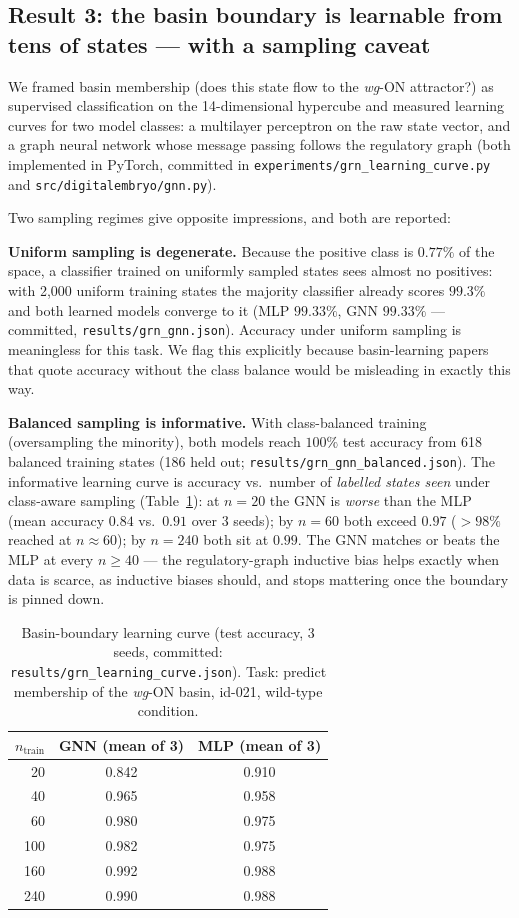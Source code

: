 \subsection{Result 3: the basin boundary is learnable from tens of states ---
with a sampling caveat}
\label{sec:basinlearn}

We framed basin membership (does this state flow to the \emph{wg}-ON
attractor?) as supervised classification on the 14-dimensional hypercube and
measured learning curves for two model classes: a multilayer perceptron on
the raw state vector, and a graph neural network whose message passing
follows the regulatory graph (both implemented in PyTorch, committed in
\texttt{experiments/grn\_learning\_curve.py} and \texttt{src/digitalembryo/gnn.py}).

Two sampling regimes give opposite impressions, and both are reported:

\textbf{Uniform sampling is degenerate.} Because the positive class is
$0.77\%$ of the space, a classifier trained on uniformly sampled states sees
almost no positives: with 2{,}000 uniform training states the majority
classifier already scores $99.3\%$ and both learned models converge to it
(MLP $99.33\%$, GNN $99.33\%$ --- committed, \texttt{results/grn\_gnn.json}).
Accuracy under uniform sampling is meaningless for this task. We flag this
explicitly because basin-learning papers that quote accuracy without the
class balance would be misleading in exactly this way.

\textbf{Balanced sampling is informative.} With class-balanced training
(oversampling the minority), both models reach $100\%$ test accuracy from
618 balanced training states (186 held out; \texttt{results/grn\_gnn\_balanced.json}).
The informative learning curve is accuracy vs.\ number of
\emph{labelled states seen} under class-aware sampling
(Table~\ref{tab:learning}): at $n = 20$ the GNN is \emph{worse} than the MLP
(mean accuracy $0.84$ vs.\ $0.91$ over 3 seeds); by $n = 60$ both exceed
$0.97$ ($>98\%$ reached at $n \approx 60$); by $n = 240$ both sit at
$0.99$. The GNN matches or beats the MLP at every $n \ge 40$ --- the
regulatory-graph inductive bias helps exactly when data is scarce, as
inductive biases should, and stops mattering once the boundary is pinned
down.

\begin{table}[!htbp]
\centering
\caption{Basin-boundary learning curve (test accuracy, 3 seeds, committed:
\texttt{results/grn\_learning\_curve.json}). Task: predict membership of the
\emph{wg}-ON basin, id-021, wild-type condition.}
\label{tab:learning}
\begin{tabular}{rcc}
\toprule
$n_{\mathrm{train}}$ & GNN (mean of 3) & MLP (mean of 3) \\
\midrule
20  & 0.842 & 0.910 \\
40  & 0.965 & 0.958 \\
60  & 0.980 & 0.975 \\
100 & 0.982 & 0.975 \\
160 & 0.992 & 0.988 \\
240 & 0.990 & 0.988 \\
\bottomrule
\end{tabular}
\end{table}

